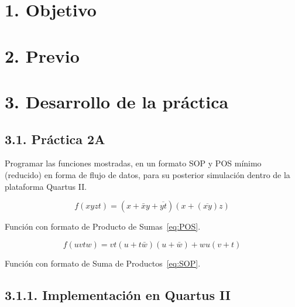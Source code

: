 \documentclass[letterpaper]{article} %
\begin{document}
    \section{1. Objetivo}


    \section*{2. Previo}

    \section*{3. Desarrollo de la pr\'actica}
        \subsection*{3.1. Pr\'actica 2A}
        Programar las funciones mostradas, en un formato SOP y POS m\'inimo (reducido) en
        forma de flujo de datos, para su posterior simulaci\'on dentro de la plataforma Quartus II.

        \begin{equation}
            \label{eq:POS}
            f(xyzt) = (x + \bar{x}y + \overline{yt})(x + (\overline{xy})z)
        \end{equation}

        Funci\'on con formato de Producto de Sumas~\ref{eq:POS}.

        \begin{equation}
            \label{eq:SOP}
            f(uvtw) = vt(u + t\bar{w})(u + \bar{w}) + wu(v +t)
        \end{equation}

        Funci\'on con formato de Suma de Productos~\ref{eq:SOP}.

            \subsection*{3.1.1. Implementaci\'on en Quartus II}

                \begin{figure}[h!]
                    \raggedright
                \end{figure}
\end{document}
